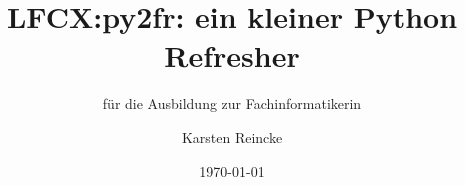\documentclass[]{beamer}
\title{LFCX:py2fr: ein kleiner Python Refresher}
\subtitle{für die Ausbildung zur Fachinformatikerin}
\institute{GS-LDK}
\author{Karsten Reincke}
\date{\today}
\def\cfgGl{../../../cfg.gl/}
\begin{document}

\begin{frame}
  \titlepage
\end{frame}






\logo{}
\newpage



%
\end{document}
